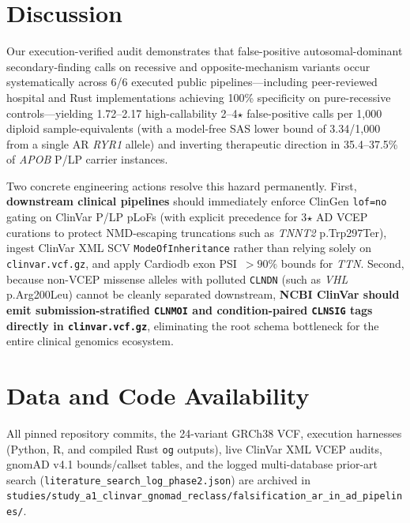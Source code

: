 \documentclass[11pt,letterpaper]{article}
\begin{document}
\section{Discussion}
Our execution-verified audit demonstrates that false-positive autosomal-dominant secondary-finding calls on recessive and opposite-mechanism variants occur systematically across 6/6 executed public pipelines---including peer-reviewed hospital and Rust implementations achieving 100\% specificity on pure-recessive controls---yielding 1.72--2.17 high-callability 2--4$\star$ false-positive calls per 1,000 diploid sample-equivalents (with a model-free SAS lower bound of 3.34/1,000 from a single AR \textit{RYR1} allele) and inverting therapeutic direction in 35.4--37.5\% of \textit{APOB} P/LP carrier instances.

Two concrete engineering actions resolve this hazard permanently. First, \textbf{downstream clinical pipelines} should immediately enforce ClinGen \texttt{lof=no} gating on ClinVar P/LP pLoFs (with explicit precedence for 3$\star$ AD VCEP curations to protect NMD-escaping truncations such as \textit{TNNT2} p.Trp297Ter), ingest ClinVar XML SCV \texttt{ModeOfInheritance} rather than relying solely on \texttt{clinvar.vcf.gz}, and apply Cardiodb exon PSI~$>90\%$ bounds for \textit{TTN}. Second, because non-VCEP missense alleles with polluted \texttt{CLNDN} (such as \textit{VHL} p.Arg200Leu) cannot be cleanly separated downstream, \textbf{NCBI ClinVar should emit submission-stratified \texttt{CLNMOI} and condition-paired \texttt{CLNSIG} tags directly in \texttt{clinvar.vcf.gz}}, eliminating the root schema bottleneck for the entire clinical genomics ecosystem.

\section*{Data and Code Availability}
All pinned repository commits, the 24-variant GRCh38 VCF, execution harnesses (Python, R, and compiled Rust \texttt{og} outputs), live ClinVar XML VCEP audits, gnomAD v4.1 bounds/callset tables, and the logged multi-database prior-art search (\texttt{literature\_search\_log\_phase2.json}) are archived in \texttt{studies/\allowbreak study\_a1\_clinvar\_gnomad\_reclass/\allowbreak falsification\_ar\_in\_ad\_pipelines/}.

{\small


}
\end{document}
